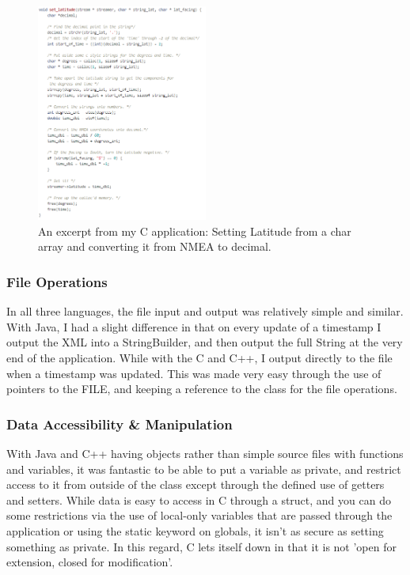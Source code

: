 \documentclass{article}
\begin{document}
\begin{figure}[H]
  \centering
    \includegraphics[width=0.5\textwidth]{img/latitude}
  \caption{An excerpt from my C application: Setting Latitude from a char array and converting it from NMEA to decimal.}
\end{figure}

\subsubsection{File Operations}

In all three languages, the file input and output was relatively simple and similar. With Java, I had a slight difference in that on every update of a timestamp I output the XML into a StringBuilder, and then output the full String at the very end of the application. While with the C and C++, I output directly to the file when a timestamp was updated. This was made very easy through the use of pointers to the FILE, and keeping a reference to the class for the file operations.

\subsubsection{Data Accessibility \& Manipulation}

With Java and C++ having objects rather than simple source files with functions and variables, it was fantastic to be able to put a variable as private, and restrict access to it from outside of the class except through the defined use of getters and setters. While data is easy to access in C through a struct, and you can do some restrictions via the use of local-only variables that are passed through the application or using the static keyword on globals, it isn't as secure as setting something as private. In this regard, C lets itself down in that it is not 'open for extension, closed for modification'.
\end{document}
